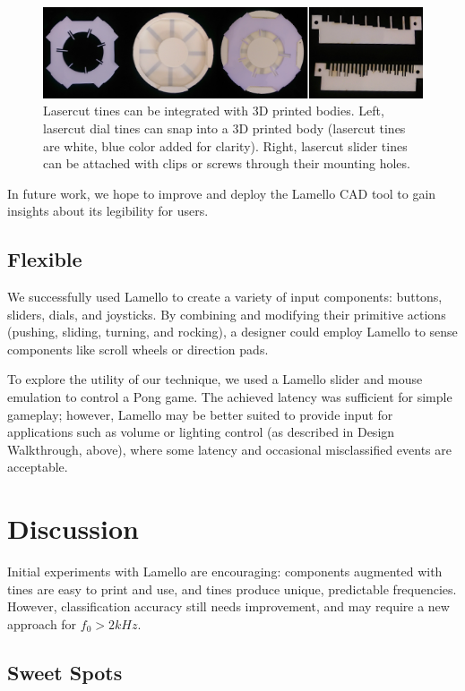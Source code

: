 \begin{figure}
  \centering
    \includegraphics[width=\textwidth]{figures/lamello/lamello-laser.png}
  \caption{Lasercut tines can be integrated with 3D printed bodies. Left, lasercut dial tines can snap into a 3D printed body (lasercut tines are white, blue color added for clarity). Right, lasercut slider tines can be attached with clips or screws through their mounting holes.} 
  \label{fig:lamello-laser}
\end{figure}
    
    In future work, we hope to improve and deploy the Lamello CAD tool to gain insights about its legibility for users.

    \subsection{Flexible}
    We successfully used Lamello to create a variety of input components: buttons, sliders, dials, and joysticks. By combining and modifying their primitive actions (pushing, sliding, turning, and rocking), a designer could employ Lamello to sense components like scroll wheels or direction pads.
    
    To explore the utility of our technique, we used a Lamello slider and mouse emulation to control a Pong game. The achieved latency was sufficient for simple gameplay; however, Lamello may be better suited to provide input for applications such as volume or lighting control (as described in Design Walkthrough, above), where some latency and occasional misclassified events are acceptable.

\section{Discussion}

Initial experiments with Lamello are encouraging: components augmented with tines are easy to print and use, and tines produce unique, predictable frequencies. However, classification accuracy still needs improvement, and may require a new approach for $f_0>2kHz$.

    \subsection{Sweet Spots}

